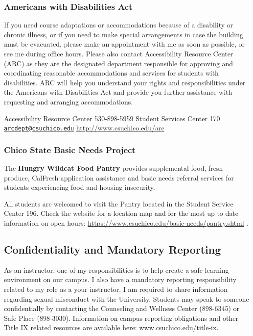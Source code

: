 \documentclass[
  11pt,
]{article}
\begin{document}
\hypertarget{americans-with-disabilities-act}{%
\subsubsection{Americans with Disabilities
Act}\label{americans-with-disabilities-act}}

If you need course adaptations or accommodations because of a disability
or chronic illness, or if you need to make special arrangements in case
the building must be evacuated, please make an appointment with me as
soon as possible, or see me during office hours. Please also contact
Accessibility Resource Center (ARC) as they are the designated
department responsible for approving and coordinating reasonable
accommodations and services for students with disabilities. ARC will
help you understand your rights and responsibilities under the Americans
with Disabilities Act and provide you further assistance with requesting
and arranging accommodations.

Accessibility Resource Center 530-898-5959 Student Services Center 170
\href{mailto:arcdept@csuchico.edu}{\nolinkurl{arcdept@csuchico.edu}}
\url{http://www.csuchico.edu/arc}

\hypertarget{chico-state-basic-needs-project}{%
\subsubsection{Chico State Basic Needs
Project}\label{chico-state-basic-needs-project}}

The \textbf{Hungry Wildcat Food Pantry} provides supplemental food,
fresh produce, CalFresh application assistance and basic needs referral
services for students experiencing food and housing insecurity.

All students are welcomed to visit the Pantry located in the Student
Service Center 196. Check the website for a location map and for the
most up to date information on open hours:
\url{https://www.csuchico.edu/basic-needs/pantry.shtml} .

\hypertarget{confidentiality-and-mandatory-reporting}{%
\subsection{Confidentiality and Mandatory
Reporting}\label{confidentiality-and-mandatory-reporting}}

As an instructor, one of my responsibilities is to help create a safe
learning environment on our campus. I also have a mandatory reporting
responsibility related to my role as a your instructor. I am required to
share information regarding sexual misconduct with the University.
Students may speak to someone confidentially by contacting the
Counseling and Wellness Center (898-6345) or Safe Place (898-3030).
Information on campus reporting obligations and other Title IX related
resources are available here: www.csuchico.edu/title-ix.
\end{document}
